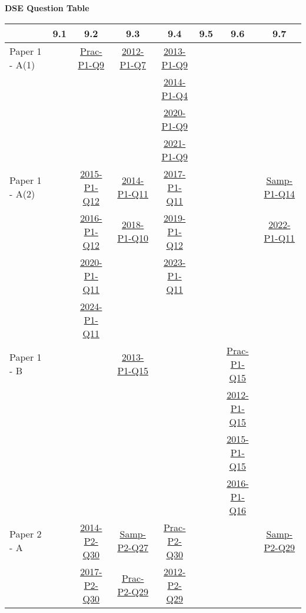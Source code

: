 \documentclass[12pt, a4paper]{article}
\begin{document}
\begin{absolutelynopagebreak}
\begin{center}
\textbf{DSE Question Table}
\end{center}
\begin{center}
\begin{tabular}{|l|c|c|c|c|c|c|c|}
\hline
        & 9.1 & 9.2 & 9.3 & 9.4 & 9.5 & 9.6 & 9.7 \\\hline
\hline
Paper 1 - A(1)&  & \hyperref[DSE2012P-CoreP1-Q09]{Prac-P1-Q9} & \hyperref[DSE2012-CoreP1-Q07]{2012-P1-Q7} & \hyperref[DSE2013-CoreP1-Q09]{2013-P1-Q9} &  &  &  \\
&  &  &  & \hyperref[DSE2014-CoreP1-Q04]{2014-P1-Q4} &  &  &  \\
&  &  &  & \hyperref[DSE2020-CoreP1-Q09]{2020-P1-Q9} &  &  &  \\
&  &  &  & \hyperref[DSE2021-CoreP1-Q09]{2021-P1-Q9} &  &  &  \\
\hline
Paper 1 - A(2)&  & \hyperref[DSE2015-CoreP1-Q12]{2015-P1-Q12} & \hyperref[DSE2014-CoreP1-Q11]{2014-P1-Q11} & \hyperref[DSE2017-CoreP1-Q11]{2017-P1-Q11} &  &  & \hyperref[DSE2012S-CoreP1-Q14]{Samp-P1-Q14} \\
&  & \hyperref[DSE2016-CoreP1-Q12]{2016-P1-Q12} & \hyperref[DSE2018-CoreP1-Q10]{2018-P1-Q10} & \hyperref[DSE2019-CoreP1-Q12]{2019-P1-Q12} &  &  & \hyperref[DSE2022-CoreP1-Q11]{2022-P1-Q11} \\
&  & \hyperref[DSE2020-CoreP1-Q11]{2020-P1-Q11} &  & \hyperref[DSE2023-CoreP1-Q11]{2023-P1-Q11} &  &  &  \\
&  & \hyperref[DSE2024-CoreP1-Q11]{2024-P1-Q11} &  &  &  &  &  \\
\hline
Paper 1 - B&  &  & \hyperref[DSE2013-CoreP1-Q15]{2013-P1-Q15} &  &  & \hyperref[DSE2012P-CoreP1-Q15]{Prac-P1-Q15} &  \\
&  &  &  &  &  & \hyperref[DSE2012-CoreP1-Q15]{2012-P1-Q15} &  \\
&  &  &  &  &  & \hyperref[DSE2015-CoreP1-Q15]{2015-P1-Q15} &  \\
&  &  &  &  &  & \hyperref[DSE2016-CoreP1-Q16]{2016-P1-Q16} &  \\
\hline
\hline
Paper 2 - A&  & \hyperref[DSE2014-CoreP2-Q30]{2014-P2-Q30} & \hyperref[DSE2012S-CoreP2-Q27]{Samp-P2-Q27} & \hyperref[DSE2012P-CoreP2-Q30]{Prac-P2-Q30} &  &  & \hyperref[DSE2012S-CoreP2-Q29]{Samp-P2-Q29} \\
&  & \hyperref[DSE2017-CoreP2-Q30]{2017-P2-Q30} & \hyperref[DSE2012P-CoreP2-Q29]{Prac-P2-Q29} & \hyperref[DSE2012-CoreP2-Q29]{2012-P2-Q29} &  &  &  \\

\end{tabular}
\end{center}
\end{absolutelynopagebreak}
\end{document}

